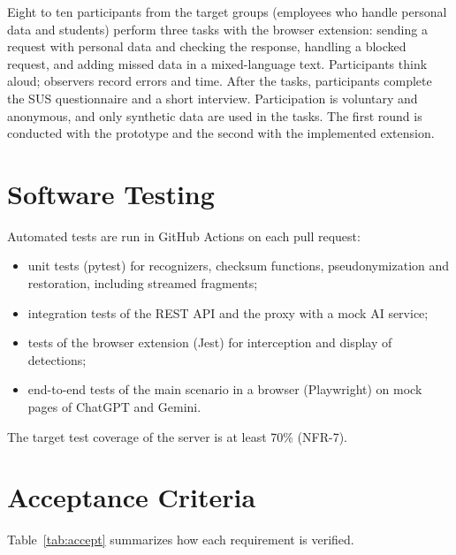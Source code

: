 \documentclass[12pt,a4paper]{article}
\begin{document}
Eight to ten participants from the target groups (employees who handle personal data and students) perform three tasks with the browser extension: sending a request with personal data and checking the response, handling a blocked request, and adding missed data in a mixed-language text. Participants think aloud; observers record errors and time. After the tasks, participants complete the SUS questionnaire and a short interview. Participation is voluntary and anonymous, and only synthetic data are used in the tasks. The first round is conducted with the prototype and the second with the implemented extension.

\section{Software Testing}

Automated tests are run in GitHub Actions on each pull request:
\begin{itemize}
\item unit tests (pytest) for recognizers, checksum functions, pseudonymization and restoration, including streamed fragments;
\item integration tests of the REST API and the proxy with a mock AI service;
\item tests of the browser extension (Jest) for interception and display of detections;
\item end-to-end tests of the main scenario in a browser (Playwright) on mock pages of ChatGPT and Gemini.
\end{itemize}
The target test coverage of the server is at least 70\% (NFR-7).

\section{Acceptance Criteria}

Table~\ref{tab:accept} summarizes how each requirement is verified.
\end{document}
